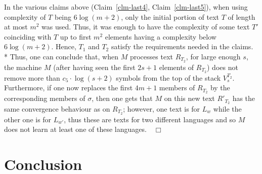 \documentclass{LMCS}
\theoremstyle{plain}\newtheorem{athm}[thm]{Theorem}
\theoremstyle{plain}\newtheorem{aprop}[thm]{Proposition}
\theoremstyle{plain}\newtheorem{aprob}[thm]{Open Problem}
\theoremstyle{plain}\newtheorem{acor}[thm]{Corollary}
\theoremstyle{plain}\newtheorem{alem}[thm]{Lemma}
\theoremstyle{definition}\newtheorem{adefn}[thm]{Definition}
\theoremstyle{definition}\newtheorem{arem}[thm]{Remark}
\theoremstyle{plain}\newtheorem{aexmp}[thm]{Example}
\theoremstyle{plain}\newtheorem{aclm}[thm]{Claim}
\def\niceqed{~~$\Box$}
\def\sp{\\*\indent}
\begin{document}
In the various claims above (Claim~\ref{clm-last4}, Claim~\ref{clm-last5}), 
when using complexity of $T$ being $6\log(m+2)$, 
only the initial portion of text $T$ of length at most $m^2$ was used.
Thus, it was enough to have the complexity of some text $T'$ coinciding
with $T$ up to first $m^2$ elements having a complexity below $6\log(m+2)$.
Hence, $T_1$ and $T_2$ satisfy the requirements needed in the claims.
\sp
Thus, one can conclude that, when $M$ processes text $R_{T_2}$,
for large enough $s$, the machine $M$ (after having seen the first
$2s+1$ elements of $R_{T_2}$) does not remove more than 
$c_5 \cdot \log(s+2)$
symbols from the top of the stack $V^{T_2}_s$.
Furthermore, if one now replaces the first $4m+1$ members of $R_{T_2}$
by the corresponding members of $\sigma$, then one gets that $M$ on
this new text $R'_{T_2}$ has the same convergence behaviour as on
$R_{T_2}$; however, one text is for $L_w$ while the other one is for
$L_{w'}$, thus these are texts for two different languages and so $M$
does not learn at least one of these languages.\niceqed

\section{Conclusion}
\end{document}
